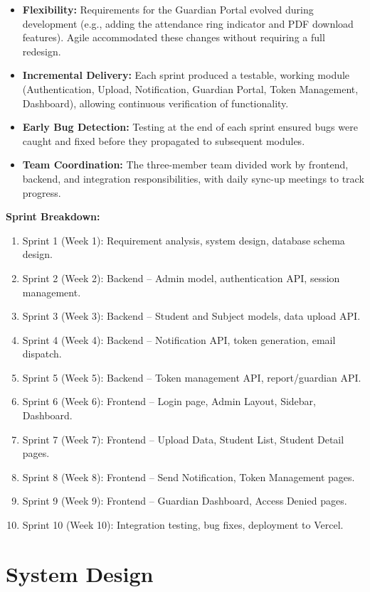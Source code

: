 \documentclass[12pt,a4paper]{report}
\begin{document}
\begin{itemize}
  \item \textbf{Flexibility:} Requirements for the Guardian Portal evolved during development (e.g., adding the attendance ring indicator and PDF download features). Agile accommodated these changes without requiring a full redesign.
  \item \textbf{Incremental Delivery:} Each sprint produced a testable, working module (Authentication, Upload, Notification, Guardian Portal, Token Management, Dashboard), allowing continuous verification of functionality.
  \item \textbf{Early Bug Detection:} Testing at the end of each sprint ensured bugs were caught and fixed before they propagated to subsequent modules.
  \item \textbf{Team Coordination:} The three-member team divided work by frontend, backend, and integration responsibilities, with daily sync-up meetings to track progress.
\end{itemize}

\textbf{Sprint Breakdown:}
\begin{enumerate}
  \item Sprint 1 (Week 1): Requirement analysis, system design, database schema design.
  \item Sprint 2 (Week 2): Backend -- Admin model, authentication API, session management.
  \item Sprint 3 (Week 3): Backend -- Student and Subject models, data upload API.
  \item Sprint 4 (Week 4): Backend -- Notification API, token generation, email dispatch.
  \item Sprint 5 (Week 5): Backend -- Token management API, report/guardian API.
  \item Sprint 6 (Week 6): Frontend -- Login page, Admin Layout, Sidebar, Dashboard.
  \item Sprint 7 (Week 7): Frontend -- Upload Data, Student List, Student Detail pages.
  \item Sprint 8 (Week 8): Frontend -- Send Notification, Token Management pages.
  \item Sprint 9 (Week 9): Frontend -- Guardian Dashboard, Access Denied pages.
  \item Sprint 10 (Week 10): Integration testing, bug fixes, deployment to Vercel.
\end{enumerate}

\chapter{System Design}
\end{document}
